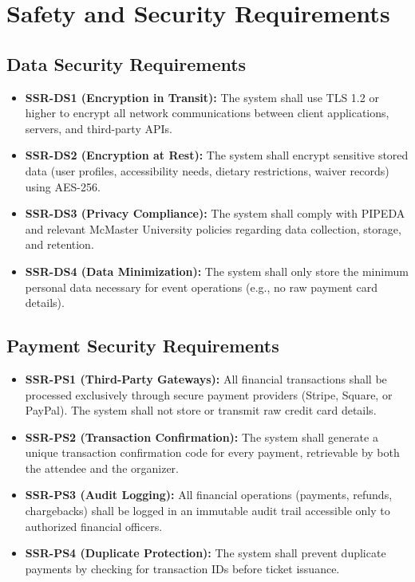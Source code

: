 \documentclass{article}
\begin{document}

\section{Safety and Security Requirements}

\subsection{Data Security Requirements}
\begin{itemize}
    \item \textbf{SSR-DS1 (Encryption in Transit):} The system shall use TLS 1.2 or higher to encrypt all network communications between client applications, servers, and third-party APIs.
    \item \textbf{SSR-DS2 (Encryption at Rest):} The system shall encrypt sensitive stored data (user profiles, accessibility needs, dietary restrictions, waiver records) using AES-256.
    \item \textbf{SSR-DS3 (Privacy Compliance):} The system shall comply with PIPEDA and relevant McMaster University policies regarding data collection, storage, and retention.
    \item \textbf{SSR-DS4 (Data Minimization):} The system shall only store the minimum personal data necessary for event operations (e.g., no raw payment card details).
\end{itemize}

\subsection{Payment Security Requirements}
\begin{itemize}
    \item \textbf{SSR-PS1 (Third-Party Gateways):} All financial transactions shall be processed exclusively through secure payment providers (Stripe, Square, or PayPal). The system shall not store or transmit raw credit card details.
    \item \textbf{SSR-PS2 (Transaction Confirmation):} The system shall generate a unique transaction confirmation code for every payment, retrievable by both the attendee and the organizer.
    \item \textbf{SSR-PS3 (Audit Logging):} All financial operations (payments, refunds, chargebacks) shall be logged in an immutable audit trail accessible only to authorized financial officers.
    \item \textbf{SSR-PS4 (Duplicate Protection):} The system shall prevent duplicate payments by checking for transaction IDs before ticket issuance.
\end{itemize}
\end{document}
